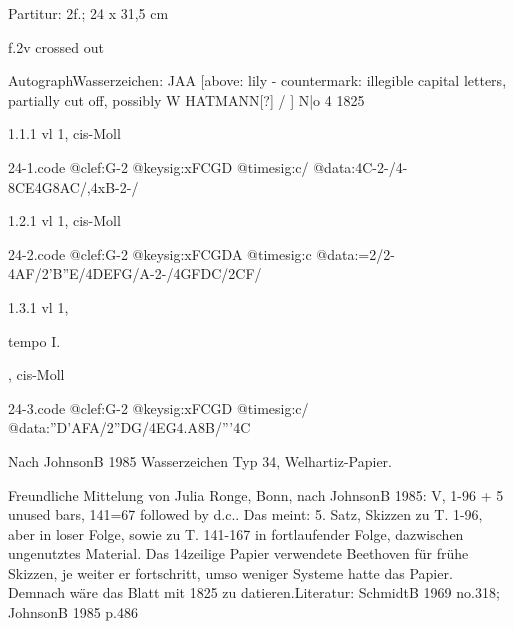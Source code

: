 \documentclass[a4paper, twocolumn, 11pt]{book}
\begin{document}
\par \textcolor{darkblue}{}  Partitur: 2f.; 24 x 31,5 cm\newline \begin{small} f.2v crossed out\end{small} \newline Autograph\newline Wasserzeichen: JAA [above: lily - countermark: illegible capital letters, partially cut off, possibly {\textquotedbl}W HATMANN{\textquotedbl}[?] / ] N|o 4  1825
\par 1.1.1  vl 1, cis-Moll  
\begin{filecontents*}{24-1.code}
@clef:G-2
@keysig:xFCGD
@timesig:c/
@data:4C-2-/4-{8CE}4G{8AC}/,4xB-2-/
\end{filecontents*}
\newline %
\par 1.2.1  vl 1, cis-Moll  
\begin{filecontents*}{24-2.code}
@clef:G-2
@keysig:xFCGDA
@timesig:c
@data:=2/2-4AF/2'B''E/4DEFG/A-2-/4GFDC/2CF/
\end{filecontents*}
\newline %
\par 1.3.1  vl 1, \begin{itshape}tempo I.\end{itshape}, cis-Moll  
\begin{filecontents*}{24-3.code}
@clef:G-2
@keysig:xFCGD
@timesig:c/
@data:''D'AFA/2''DG/4EG4.A8B/'''4C
\end{filecontents*}
\newline %
\par Nach JohnsonB 1985 Wasserzeichen Typ 34, Welhartiz-Papier.
\par Freundliche Mittelung von Julia Ronge, Bonn, nach JohnsonB 1985: {\textquotedbl}V, 1-96 + 5 unused bars, 141=67 followed by d.c.{\textquotedbl}. Das meint: 5. Satz, Skizzen zu T. 1-96, aber in loser Folge, sowie zu T. 141-167 in fortlaufender Folge, dazwischen ungenutztes Material. Das 14zeilige Papier verwendete Beethoven für frühe Skizzen, je weiter er fortschritt, umso weniger Systeme hatte das Papier. Demnach wäre das Blatt mit 1825 zu datieren.\newline Literatur: SchmidtB 1969  no.318; JohnsonB 1985  p.486
\end{document}
